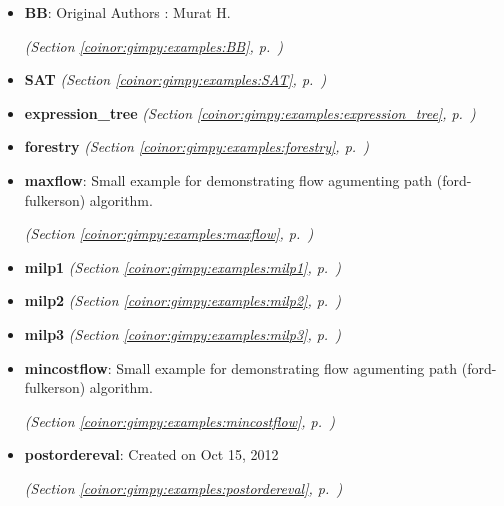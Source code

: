 \begin{itemize}
\setlength{\parskip}{0ex}
\item \textbf{BB}: 
Original Authors : Murat H. 


  \textit{(Section \ref{coinor:gimpy:examples:BB}, p.~\pageref{coinor:gimpy:examples:BB})}

\item \textbf{SAT}
  \textit{(Section \ref{coinor:gimpy:examples:SAT}, p.~\pageref{coinor:gimpy:examples:SAT})}

\item \textbf{expression\_tree}
  \textit{(Section \ref{coinor:gimpy:examples:expression_tree}, p.~\pageref{coinor:gimpy:examples:expression_tree})}

\item \textbf{forestry}
  \textit{(Section \ref{coinor:gimpy:examples:forestry}, p.~\pageref{coinor:gimpy:examples:forestry})}

\item \textbf{maxflow}: Small example for demonstrating flow agumenting path (ford-fulkerson) 
algorithm.



  \textit{(Section \ref{coinor:gimpy:examples:maxflow}, p.~\pageref{coinor:gimpy:examples:maxflow})}

\item \textbf{milp1}
  \textit{(Section \ref{coinor:gimpy:examples:milp1}, p.~\pageref{coinor:gimpy:examples:milp1})}

\item \textbf{milp2}
  \textit{(Section \ref{coinor:gimpy:examples:milp2}, p.~\pageref{coinor:gimpy:examples:milp2})}

\item \textbf{milp3}
  \textit{(Section \ref{coinor:gimpy:examples:milp3}, p.~\pageref{coinor:gimpy:examples:milp3})}

\item \textbf{mincostflow}: Small example for demonstrating flow agumenting path (ford-fulkerson) 
algorithm.



  \textit{(Section \ref{coinor:gimpy:examples:mincostflow}, p.~\pageref{coinor:gimpy:examples:mincostflow})}

\item \textbf{postordereval}: Created on Oct 15, 2012



  \textit{(Section \ref{coinor:gimpy:examples:postordereval}, p.~\pageref{coinor:gimpy:examples:postordereval})}


\end{itemize}
